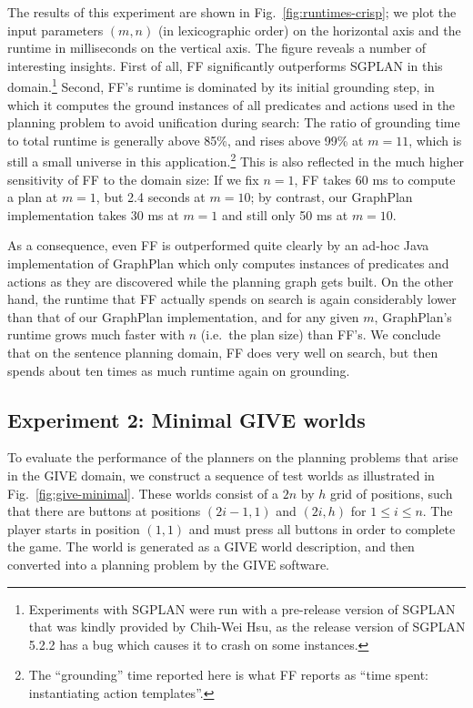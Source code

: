 The results of this experiment are shown in
Fig.~\ref{fig:runtimes-crisp}; we plot the input parameters $(m,n)$
(in lexicographic order) on the horizontal axis and the runtime in
milliseconds on the vertical axis.  The figure reveals a number of
interesting insights.  First of all, FF significantly outperforms
SGPLAN in this domain.\footnote{Experiments with SGPLAN were run with
  a pre-release version of SGPLAN that was kindly provided by Chih-Wei
  Hsu, as the release version of SGPLAN 5.2.2 has a bug which causes
  it to crash on some instances.}  Second, FF's runtime is dominated
by its initial grounding step, in which it computes the ground
instances of all predicates and actions used in the planning problem
to avoid unification during search: The ratio of grounding time to
total runtime is generally above 85\%, and rises above 99\% at $m=11$,
which is still a small universe in this application.\footnote{The
  ``grounding'' time reported here is what FF reports as ``time spent:
  instantiating action templates''.}  This is also reflected in the
much higher sensitivity of FF to the domain size: If we fix $n=1$, FF
takes 60 ms to compute a plan at $m=1$, but 2.4 seconds at $m=10$; by
contrast, our GraphPlan implementation takes 30 ms at $m=1$ and still
only 50 ms at $m=10$.

As a consequence, even FF is outperformed quite clearly by an ad-hoc
Java implementation of GraphPlan which only computes instances of
predicates and actions as they are discovered while the planning graph
gets built.  On the other hand, the runtime that FF actually spends on
search is again considerably lower than that of our GraphPlan
implementation, and for any given $m$, GraphPlan's runtime grows much
faster with $n$ (i.e.\ the plan size) than FF's.  We conclude that on
the sentence planning domain, FF does very well on search, but then
spends about ten times as much runtime again on grounding.



\subsection{Experiment 2: Minimal GIVE worlds}
\label{sec:exper-2:-minim}

To evaluate the performance of the planners on the planning problems
that arise in the GIVE domain, we construct a sequence of test worlds
as illustrated in Fig.~\ref{fig:give-minimal}.  These worlds consist
of a $2n$ by $h$ grid of positions, such that there are buttons at
positions $(2i-1,1)$ and $(2i,h)$ for $1 \leq i \leq n$.  The player
starts in position $(1,1)$ and must press all buttons in order to
complete the game.  The world is generated as a GIVE world
description, and then converted into a planning problem by the GIVE
software. 

